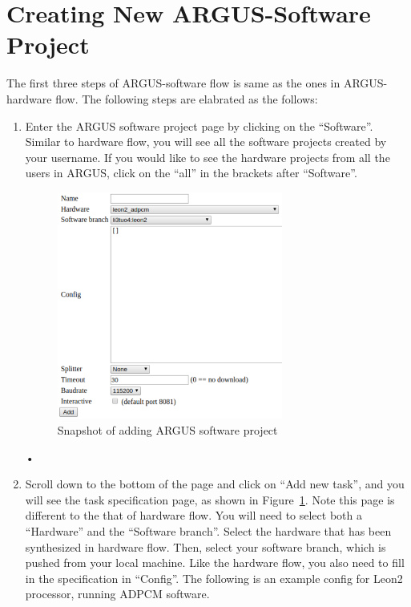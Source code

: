 \documentclass[a4paper,10pt]{article}
\begin{document}
\newpage

\section{Creating New ARGUS-Software Project}
The first three steps of ARGUS-software flow is same as the ones in ARGUS-hardware flow. The following steps are elabrated as the follows:
\begin{enumerate}
\item Enter the ARGUS software project page by clicking on the ``Software''. Similar to hardware flow, you will see all the software projects created by your username.  If you would like to see the hardware projects from all the users in ARGUS, click on the ``all'' in the brackets after ``Software''.
\begin{figure}[h]
\centering
\includegraphics[width=0.7\textwidth]{fig/addswtask.eps}
\caption{Snapshot of adding ARGUS software project}\label{fig-addswtask}
\end{figure}•
\item Scroll down to the bottom of the page and click on ``Add new task'', and you will see the task specification page, as shown in Figure~\ref{fig-addswtask}. Note this page is different to the that of hardware flow. You will need to select both a ``Hardware'' and the ``Software branch''. Select the hardware that has been synthesized in hardware flow. Then, select your software branch, which is pushed from your local machine. Like the hardware flow, you also need to fill in the specification in ``Config''. The following is an example config for Leon2 processor, running ADPCM software.
\begin{verbatim}

\end{verbatim}
\end{enumerate}
\end{document}
